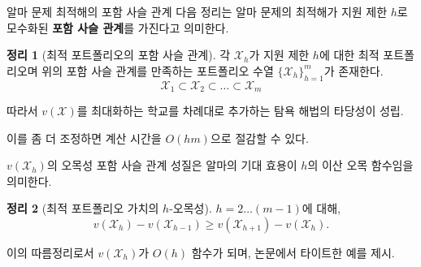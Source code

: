 \documentclass[10pt,slidestop,compress,mathserif,notheorems]{beamer}
\newif\ifen
\newtheorem{theorem}{Theorem}
\theoremstyle{definition}
\newtheorem{theorem}{정리}
\theoremstyle{definition}
\begin{document}
\begin{frame}{\ifen The nestedness property for Alma's problem\else 알마 문제 최적해의 포함 사슬 관계\fi}
\ifen The following theorem says that the solution to Alma's problem is \textbf{nested} in the application limit $h$.
\else 다음 정리는 알마 문제의 최적해가 지원 제한 $h$로 모수화된 \textbf{포함 사슬 관계}를 가진다고 의미한다. \fi
\begin{theorem}[\ifen Nestedness of optimal application portfolios\else 최적 포트폴리오의 포함 사슬 관계\fi] \label{nestedapplication}
\ifen There exists a sequence of portfolios $\{\mathcal{X}_h\}_{h=1}^m$ satisfying the nestedness relation
\else  각 $\mathcal{X}_h$가 지원 제한 $h$에 대한 최적 포트폴리오며 위의 포함 사슬 관계를 만족하는 포트폴리오 수열  $\{\mathcal{X}_h\}_{h=1}^m$가 존재한다.\fi
\begin{equation*}
\mathcal{X}_1 \subset \mathcal{X}_2\subset \dots \subset \mathcal{X}_m
\end{equation*}
\ifen such that each $\mathcal{X}_h$ is an optimal application portfolio when the application limit is $h$.\fi
\end{theorem}

\ifen
This implies the validity of a greedy algorithm that adds schools one at a time, maximizing $v(\mathcal{X})$ at each addition. 

Some additional refinement reduces the computation time to $O(hm)$.
\else
따라서 $v(\mathcal{X})$를 최대화하는 학교를 차례대로 추가하는 탐욕 해법의 타당성이 성립.

이를 좀 더 조정하면 계산 시간을 $O(hm)$으로 절감할 수 있다.
\fi
\end{frame}





\begin{frame}{\ifen Concavity of $v(\mathcal{X}_h)$\else $v(\mathcal{X}_h)$의 오목성\fi}
\ifen The nestedness property implies that Alma's expected utility is a discretely concave function of $h$.
\else 포함 사슬 관계 성질은 알마의 기대 효용이 $h$의 이산 오목 함수임을 의미한다.\fi

\begin{theorem}[\ifen Optimal portfolio valuation concave in $h$\else 최적 포트폴리오 가치의 $h$-오목성\fi] \label{concavityinh}
\ifen For $h = 2 \dots (m-1)$,
\else $h = 2 \dots (m-1)$에 대해,\fi
\begin{equation*}v(\mathcal{X}_h) - v(\mathcal{X}_{h-1}) \geq v(\mathcal{X}_{h+1}) - v(\mathcal{X}_{h}).\end{equation*} 
\end{theorem}

\ifen
Corollary: $v(\mathcal{X}_h)$ is $O(h)$. Paper contains a tight example. 
\else
이의 따름정리로서 $v(\mathcal{X}_h)$가 $O(h)$ 함수가 되며, 논문에서 타이트한 예를 제시. 
\fi
\end{frame}
\end{document}
